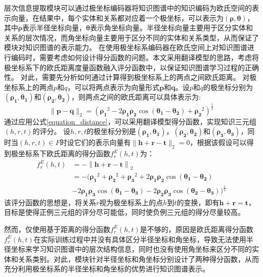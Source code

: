 \documentclass[algorithmlist, AutoFakeBold, AutoFakeSlant, figurelist, tablelist, nomlist, engineering]{seuthesix}
\begin{document}
层次信息提取模块可以通过极坐标编码器将知识图谱中的知识编码为欧氏空间的表示向量，在结果中，每个实体和关系都对应着一个极坐标，可以表示为$(\bm{\rho}, \bm{\theta})$， 其中$\bm{\rho}$表示半径坐标向量，$\bm{\theta}$表示角坐标向量。半径坐标向量主要用于区分实体和关系的层次情况，而角坐标向量主要用于区分不同的实体和关系类型，从而保证了模块对知识图谱的表示能力。
在使用极坐标系编码器在欧氏空间上对知识图谱进行编码时，需要考虑如何设计得分函数的问题。本文采用翻译模型的思路，考虑将极坐标系下的欧氏距离度量函数融入评分函数中，以保证知识图谱学习过程的正确性。
对此，需要先分析如何通过计算得到极坐标系上的两点之间欧氏距离。
对极坐标系上的两点$p$和$q$，可以将两点表示为向量形式$\bm{p}$和$\bm{q}$。设$p$和$q$的极坐标分别为$(\bm{\rho_1}, \bm{\theta_1})$和$(\bm{\rho_2}, \bm{\theta_2})$，则两点之间的欧氏距离可以具体表示为:
\begin{equation}
  \|\bm{p}-\bm{q}\|_2=\left(\bm{\rho_1}^2-2 \bm{\rho_1} \bm{\rho_2} \cos \left(\bm{\theta_1}-\bm{\theta_2}\right)+\bm{\rho_2}^2\right)^{\frac{1}{2}}
  \label{equation_distance}
\end{equation}
通过应用公式\ref{equation_distance}，可以采用翻译模型得分函数，实现知识三元组$(h, r, t)$的评分。
设$h, r, t$的极坐标分别是$\left(\bm{\rho_1}, \bm{\theta_1}\right)$，$\left(\bm{\rho_2}, \bm{\theta_2}\right)$和$\left(\bm{\rho_3}, \bm{\theta_3}\right)$，同时当$(h, r, t) \in F$时设它们的表示向量有$\|\bm{h} + \bm{r} - \bm{t}\|_2 = 0$，根据该假设可以得到极坐标系下欧氏距离的得分函数$f^E_r(h, t)$为：
\begin{equation}
  \begin{aligned}
    f^{E}_{r}\left(h, t\right) & =-\left\|\bm{h}+\bm{r}-\bm{t}\right\|_2 \\
    & =-(\bm{\rho_1}^2+\bm{\rho_2}^2+\bm{\rho_3}^2 + 2 \bm{\rho_1} \bm{\rho_2} \cos \left(\bm{\theta_1}-\bm{\theta_2}\right) \\
    & - 2 \bm{\rho_1} \bm{\rho_3} \cos \left(\bm{\theta_1}-\bm{\theta_3}\right) - 2 \bm{\rho_2} \bm{\rho_3} \cos \left(\bm{\theta_2}-\bm{\theta_3}\right))^{\frac{1}{2}}
  \end{aligned}
\end{equation}
该评分函数的思想是，将关系$r$视为极坐标系上的点$h$到$t$的变换，即有$\bm{h} + \bm{r} = \bm{t}$，目标是使得正例三元组的评分尽可能低，同时使负例三元组的得分尽量较高。

然而，仅使用基于距离的得分函数$f^E_r(h, t)$是不够的，原因是欧氏距离得分函数$f^E_r(h, t)$在实际训练过程中并没有具体区分半径坐标和角坐标，导致无法使用半径坐标来学习知识图谱中的层次结构信息，同时也没有使用角坐标来区分不同的实体和关系类别。对此，模块针对半径坐标和角坐标分别设计了两种得分函数，从而充分利用极坐标系的半径坐标和角坐标的优势进行知识图谱表示。
\end{document}
